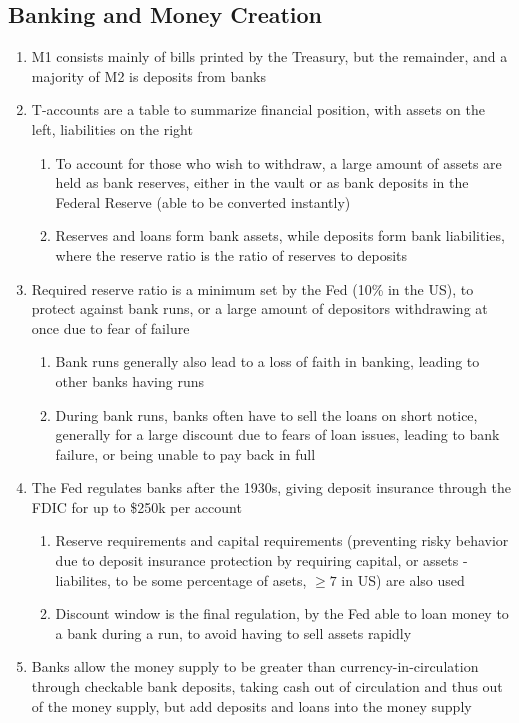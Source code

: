 \documentclass[11 pt, twoside]{article}
\begin{document}
\subsection{Banking and Money Creation}
\begin{enumerate}
\item M1 consists mainly of bills printed by the Treasury, but the remainder, and a majority of M2 is deposits from banks
\item T-accounts are a table to summarize financial position, with assets on the left, liabilities on the right
\begin{enumerate}
\item To account for those who wish to withdraw, a large amount of assets are held as bank reserves, either in the vault or as bank deposits in the Federal Reserve (able to be converted instantly)
\item Reserves and loans form bank assets, while deposits form bank liabilities, where the reserve ratio is the ratio of reserves to deposits
\end{enumerate}
\item Required reserve ratio is a minimum set by the Fed (10\% in the US), to protect against bank runs, or a large amount of depositors withdrawing at once due to fear of failure
\begin{enumerate}
\item Bank runs generally also lead to a loss of faith in banking, leading to other banks having runs
\item During bank runs, banks often have to sell the loans on short notice, generally for a large discount due to fears of loan issues, leading to bank failure, or being unable to pay back in full
\end{enumerate}
\item The Fed regulates banks after the 1930s, giving deposit insurance through the FDIC for up to \$250k per account
\begin{enumerate}
\item Reserve requirements and capital requirements (preventing risky behavior due to deposit insurance protection by requiring capital, or assets - liabilites, to be some percentage of asets, $\geq 7$ in US) are also used
\item Discount window is the final regulation, by the Fed able to loan money to a bank during a run, to avoid having to sell assets rapidly
\end{enumerate}
\item Banks allow the money supply to be greater than currency-in-circulation through checkable bank deposits, taking cash out of circulation and thus out of the money supply, but add deposits and loans into the money supply

\end{enumerate}
\end{document}
